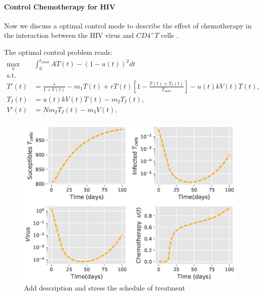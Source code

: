\paragraph{Control Chemotherapy for HIV} 
	Now we discuss a optimal control mode to describe the effect of chemotherapy
in the interaction between the HIV virus and $CD4^+T$ cells 
\cite{butler1997optimal}.


The optimal control problem reads:
\begin{equation}
	\begin{aligned}
		\max_{u} & \int_{0}^{t_{final}}
			A  T(t) - (1-u(t)) ^ 2 dt
		\\
		\text{s.t. }
		\\
			T'(t) &=
				\frac{s}{1 + V(t)}
				- m_1 T(t) 
				+ r T(t)
				\left[
					1 - \frac{T(t)+ T_{I}(t)}{T_{max}}
				\right] 
				- u(t) k V(t) T(t),
			\\
			T_{I}(t) &=
				u(t) k V(t) T(t) - m_2 T_{I}(t),
			\\
			V'(t) &= N m_2 T_{I}(t) - m_3 V(t),
			\\
	\end{aligned}
\end{equation}

\begin{figure}[tbh]
\centering
	\includegraphics[width=0.7\linewidth]{Figures/hiv_chemotherapy_fig_01}
	\caption{Add description and stress the schedule of treatment}
	\label{fig:hivchemotherapyfig01}
\end{figure}
